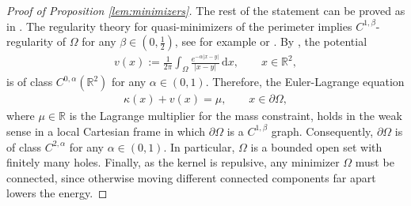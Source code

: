 \documentclass[11pt]{article}
\newcounter{statement}
\numberwithin{statement}{section}
\numberwithin{equation}{section}
\theoremstyle{remark}
\newcommand{\R}{\mathbb R} 				%
\newcommand{\intd}{\, \mathrm{d}} 				%
\begin{document}
\begin{proof}[Proof of Proposition \ref{lem:minimizers}]
        The rest of the statement can be proved as in
        \cite[Proposition 2.1]{knupfer2013isoperimetric}. The
        regularity theory for quasi-minimizers of the perimeter
        implies $C^{1,\beta}$-regularity of $\Omega$ for any
        $\beta \in (0, \frac12)$, see for example \cite[Theorem
        21.8]{maggi} or \cite[Theorem 1.4.9]{rigot00}.  By
        \cite[Theorem 5.2]{gatto}, the potential
        \begin{align}
          v(x) := \frac{1}{ 2 \pi} \int_\Omega
          \frac{e^{-\alpha|x-y|}}{|x-y|} \intd x, \qquad x \in
          \R^2,
        \end{align}
        is of class $C^{0,\alpha}(\R^2)$ for any $\alpha \in (0,1)$.
        Therefore, the Euler-Lagrange equation
         \begin{align}
           \kappa(x) +  v(x) = \mu,\qquad x \in
           \partial \Omega,
        \end{align}
        where $\mu \in \R$ is the Lagrange multiplier for the
        mass constraint, holds
        in the weak sense in a local Cartesian frame in which
          $\partial \Omega$ is a $C^{1,\beta}$ graph.  Consequently,
          $\partial \Omega$ is of class $C^{2,\alpha}$ for any
          $\alpha \in (0,1)$. In particular, $\Omega$ is a bounded
          open set with finitely many holes. Finally, as the kernel is
          repulsive, any minimizer $\Omega$ must be connected, since
          otherwise moving different connected components far apart
          lowers the energy.
\end{proof}
	
\end{document}

